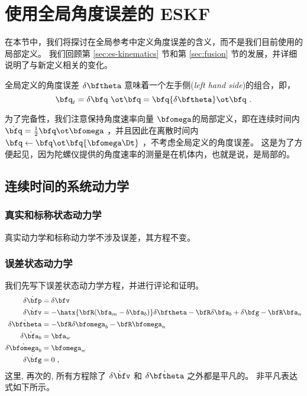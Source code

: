 

\section{使用全局角度误差的 ESKF}
\label{sec:ESKFglobal}

在本节中，我们将探讨在全局参考中定义角度误差的含义，而不是我们目前使用的局部定义。 
我们回顾第 \ref{sec:es-kinematics} 节和第 \ref{sec:fusion} 节的发展，并详细说明了与新定义相关的变化。

全局定义的角度误差 $\delta\bftheta$ 意味着一个左手侧(\emph{left hand side})的组合，即，
%
\begin{equation*}
\bfq_t = \delta\bfq\ \ot \bfq = \bfq\{\delta\bftheta\} \ot \bfq~.
\end{equation*}

为了完备性，我们注意保持角度速率向量 $\bfomega$的局部定义，即在连续时间内 $\dot\bfq=\frac12\bfq\ot\bfomega$ ，并且因此在离散时间内 $\bfq \gets \bfq\ot\bfq\{\bfomega\Dt\}$ ，不考虑全局定义的角度误差。 
这是为了方便起见，因为陀螺仪提供的角度速率的测量是在机体内，也就是说，是局部的。

\subsection{连续时间的系统动力学}

\subsubsection{真实和标称状态动力学}

真实动力学和标称动力学不涉及误差，其方程不变。

\subsubsection{误差状态动力学}

我们先写下误差状态动力学方程，并进行评论和证明。
%
\begin{subequations}\label{equ:efullglobal}
%
\begin{align}
\dot{\delta\bfp} &= \delta\bfv \label{equ:epglobal} \\
\dot{\delta\bfv} &= -\hatx{\bfR(\bfa_m-b\bfa_b)}\delta\bftheta - \bfR\delta\bfa_b + \delta\bfg - \bfR\bfa_n \label{equ:evglobal}\\
\dot{\delta\bftheta} &= -\bfR\delta\bfomega_b - \bfR\bfomega_n \label{equ:etglobal}\\
\dot{\delta\bfa_b} &= \bfa_w \label{equ:eabglobal}\\
\dot{\delta\bfomega_b} &= \bfomega_w \label{equ:ewbglobal}\\
\dot{\delta\bfg} &= 0 ~, \label{equ:egglobal}
\end{align}%
\end{subequations}%
%
这里, 再次的, 所有方程除了 $\dot{\delta\bfv}$ 和 $\dot{\delta\bftheta}$ 之外都是平凡的。 
非平凡表达式如下所示。


